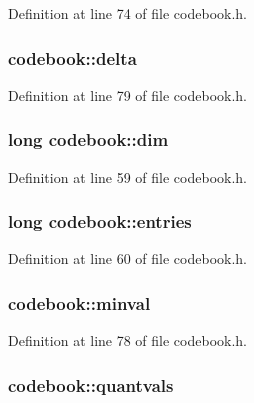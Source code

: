 Definition at line 74 of file codebook.\+h.

\subsubsection[{\texorpdfstring{delta}{delta}}]{ codebook\+::delta}\hypertarget{structcodebook_aad494f73f5a9601fa1487bc6273a9c51}{}\label{structcodebook_aad494f73f5a9601fa1487bc6273a9c51}


Definition at line 79 of file codebook.\+h.

\subsubsection[{\texorpdfstring{dim}{dim}}]{\setlength{\rightskip}{0pt plus 5cm}long codebook\+::dim}\hypertarget{structcodebook_a686979784ac16e673f22201ed3c4a155}{}\label{structcodebook_a686979784ac16e673f22201ed3c4a155}


Definition at line 59 of file codebook.\+h.

\subsubsection[{\texorpdfstring{entries}{entries}}]{\setlength{\rightskip}{0pt plus 5cm}long codebook\+::entries}\hypertarget{structcodebook_ad025d4a6ebb7417a99870380bfbd1a66}{}\label{structcodebook_ad025d4a6ebb7417a99870380bfbd1a66}


Definition at line 60 of file codebook.\+h.

\subsubsection[{\texorpdfstring{minval}{minval}}]{ codebook\+::minval}\hypertarget{structcodebook_af5e852ab410920fe29bcaae8552cd491}{}\label{structcodebook_af5e852ab410920fe29bcaae8552cd491}


Definition at line 78 of file codebook.\+h.

\subsubsection[{\texorpdfstring{quantvals}{quantvals}}]{ codebook\+::quantvals}\hypertarget{structcodebook_a02612403c90ae6b2044d926db9764c8a}{}\label{structcodebook_a02612403c90ae6b2044d926db9764c8a}


